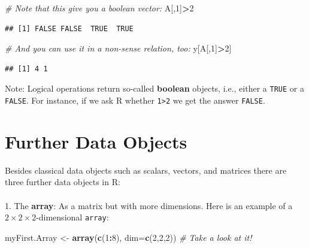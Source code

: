 \documentclass[]{book}
\newenvironment{Shaded}{\begin{snugshade}}{\end{snugshade}}
\newcommand{\CommentTok}[1]{\textcolor[rgb]{0.56,0.35,0.01}{\textit{#1}}}
\newcommand{\DataTypeTok}[1]{\textcolor[rgb]{0.13,0.29,0.53}{#1}}
\newcommand{\DecValTok}[1]{\textcolor[rgb]{0.00,0.00,0.81}{#1}}
\newcommand{\KeywordTok}[1]{\textcolor[rgb]{0.13,0.29,0.53}{\textbf{#1}}}
\newcommand{\NormalTok}[1]{#1}
\newcommand{\OperatorTok}[1]{\textcolor[rgb]{0.81,0.36,0.00}{\textbf{#1}}}
\newcommand{\StringTok}[1]{\textcolor[rgb]{0.31,0.60,0.02}{#1}}
\theoremstyle{definition}
\theoremstyle{definition}
\theoremstyle{definition}
\theoremstyle{remark}
\begin{document}
\begin{Shaded}
\begin{Highlighting}[]
\CommentTok{# Note that this give you a boolean vector:}
\NormalTok{A[,}\DecValTok{1}\NormalTok{]}\OperatorTok{>}\DecValTok{2}
\end{Highlighting}
\end{Shaded}

\begin{verbatim}
## [1] FALSE FALSE  TRUE  TRUE
\end{verbatim}

\begin{Shaded}
\begin{Highlighting}[]
\CommentTok{# And you can use it in a non-sense relation, too:}
\NormalTok{y[A[,}\DecValTok{1}\NormalTok{]}\OperatorTok{>}\DecValTok{2}\NormalTok{]}
\end{Highlighting}
\end{Shaded}

\begin{verbatim}
## [1] 4 1
\end{verbatim}

Note: Logical operations return so-called \textbf{boolean} objects, i.e., either a \texttt{TRUE} or a \texttt{FALSE}. For instance, if we ask R whether \texttt{1\textgreater{}2} we get the answer \texttt{FALSE}.

\hypertarget{further-data-objects}{%
\section{Further Data Objects}\label{further-data-objects}}

Besides classical data objects such as scalars, vectors, and matrices there are three further data objects in R:\\
~\\
1. The \textbf{array}: As a matrix but with more dimensions. Here is an example of a \(2\times 2\times 2\)-dimensional \texttt{array}:

\begin{Shaded}
\begin{Highlighting}[]
\NormalTok{myFirst.Array <-}\StringTok{ }\KeywordTok{array}\NormalTok{(}\KeywordTok{c}\NormalTok{(}\DecValTok{1}\OperatorTok{:}\DecValTok{8}\NormalTok{), }\DataTypeTok{dim=}\KeywordTok{c}\NormalTok{(}\DecValTok{2}\NormalTok{,}\DecValTok{2}\NormalTok{,}\DecValTok{2}\NormalTok{)) }\CommentTok{# Take a look at it!}
\end{Highlighting}
\end{Shaded}
\end{document}
